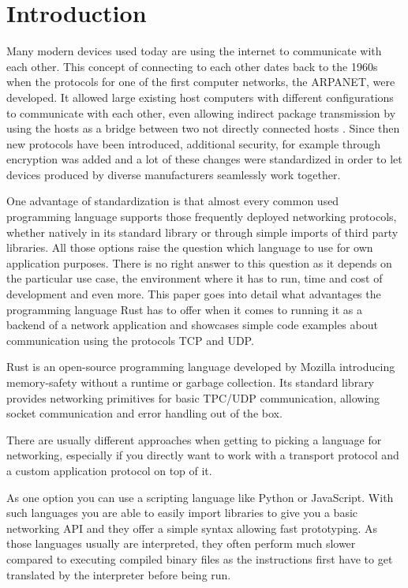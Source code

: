 
\section{Introduction}
Many modern devices used today are using the internet to communicate with each other. This concept of connecting to
each other dates back to the 1960s when the protocols for one of the first computer networks, the ARPANET, were
developed. It allowed large existing host computers with different configurations to communicate with each other, even
allowing indirect package transmission by using the hosts as a bridge between two not directly connected hosts
\cite{f70arpa}. Since then new protocols have been introduced, additional security, for example through encryption was
added and a lot of these changes were standardized in order to let devices produced by diverse manufacturers seamlessly
work together.

One advantage of standardization is that almost every common used programming language supports those frequently
deployed networking protocols, whether natively in its standard library or through simple imports of third party
libraries. All those options raise the question which language to use for own application purposes. There is no right
answer to this question as it depends on the particular use case, the environment where it has to run, time and cost of
development and even more. This paper goes into detail what advantages the programming language Rust has to offer when
it comes to running it as a backend of a network application and showcases simple code examples about communication
using the protocols TCP and UDP.

Rust is an open-source programming language developed by Mozilla introducing memory-safety without a runtime or garbage
collection. Its standard library provides networking primitives for basic TPC/UDP communication, allowing socket
communication and error handling out of the box. \cite{rust-language}

There are usually different approaches when getting to picking a language for networking, especially if you directly
want to work with a transport protocol and a custom application protocol on top of it.

As one option you can use a scripting language like Python or JavaScript. With such languages you are able to easily
import libraries to give you a basic networking API and they offer a simple syntax allowing fast prototyping. As those
languages usually are interpreted, they often perform much slower compared to executing compiled binary files as the
instructions first have to get translated by the interpreter before being run.

